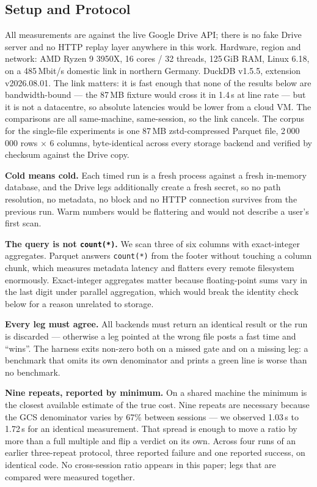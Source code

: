 \documentclass[sigconf, nonacm]{acmart}
\begin{document}
\subsection{Setup and Protocol}

All measurements are against the live Google Drive API; there is no fake Drive
server and no HTTP replay layer anywhere in this work. Hardware, region and
network: AMD Ryzen 9 3950X, 16 cores / 32 threads, 125\,GiB RAM, Linux 6.18,
on a 485\,Mbit/s domestic link in northern Germany. DuckDB v1.5.5, extension
v2026.08.01. The link matters: it is fast enough that none of the results
below are bandwidth-bound --- the 87\,MB fixture would cross it in 1.4\,s at
line rate --- but it is not a datacentre, so absolute latencies would be lower
from a cloud VM. The comparisons are all same-machine, same-session, so the
link cancels. The corpus for the single-file experiments is one 87\,MB
zstd-compressed Parquet file, 2\,000\,000 rows $\times$ 6 columns, byte-identical
across every storage backend and verified by checksum against the Drive copy.

\textbf{Cold means cold.} Each timed run is a fresh process against a fresh
in-memory database, and the Drive legs additionally create a fresh secret, so
no path resolution, no metadata, no block and no HTTP connection survives from
the previous run. Warm numbers would be flattering and would not describe a
user's first scan.

\textbf{The query is not \texttt{count(*)}.} We scan three of six columns with
exact-integer aggregates. Parquet answers \texttt{count(*)} from the footer
without touching a column chunk, which measures metadata latency and flatters
every remote filesystem enormously. Exact-integer aggregates matter because
floating-point sums vary in the last digit under parallel aggregation, which
would break the identity check below for a reason unrelated to storage.

\textbf{Every leg must agree.} All backends must return an identical result or
the run is discarded --- otherwise a leg pointed at the wrong file posts a fast
time and ``wins''. The harness exits non-zero both on a missed gate and on a
missing leg: a benchmark that omits its own denominator and prints a green line
is worse than no benchmark.

\textbf{Nine repeats, reported by minimum.} On a shared machine the minimum is
the closest available estimate of the true cost. Nine repeats are necessary
because the GCS denominator varies by 67\% between sessions --- we observed
1.03\,s to 1.72\,s for an identical measurement. That spread is enough to move
a ratio by more than a full multiple and flip a verdict on its own. Across
four runs of an earlier three-repeat protocol, three reported failure and one
reported success, on identical code. No cross-session ratio appears in this
paper; legs that are compared were measured together.
\end{document}
